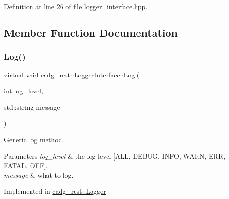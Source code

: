 Definition at line 26 of file logger\+\_\+interface.\+hpp.



\subsection{Member Function Documentation}
\mbox{\label{classcadg__rest_1_1_logger_interface_a56f53c1fb9687825ade3acced5e3a10a}} 
\subsubsection{\texorpdfstring{Log()}{Log()}\hspace{0.1cm}{\footnotesize\ttfamily [1/3]}}
{\footnotesize\ttfamily virtual void cadg\+\_\+rest\+::\+Logger\+Interface\+::\+Log (\begin{DoxyParamCaption}\item[{int}]{log\+\_\+level,  }\item[{std\+::string}]{message }\end{DoxyParamCaption})\hspace{0.3cm}{\ttfamily [pure virtual]}}



Generic log method. 


\begin{DoxyParams}{Parameters}
{\em log\+\_\+level} & the log level \mbox{[}A\+LL, D\+E\+B\+UG, I\+N\+FO, W\+A\+RN, E\+RR, F\+A\+T\+AL, O\+FF\mbox{]}. \\
\hline
{\em message} & what to log. \\
\hline
\end{DoxyParams}


Implemented in \mbox{\hyperlink{classcadg__rest_1_1_logger_a192e92e4e3137687bedbfd1157257e78}{cadg\+\_\+rest\+::\+Logger}}.

\mbox{\label{classcadg__rest_1_1_logger_interface_afe3de82598193daa3442818c242132b0}} 
